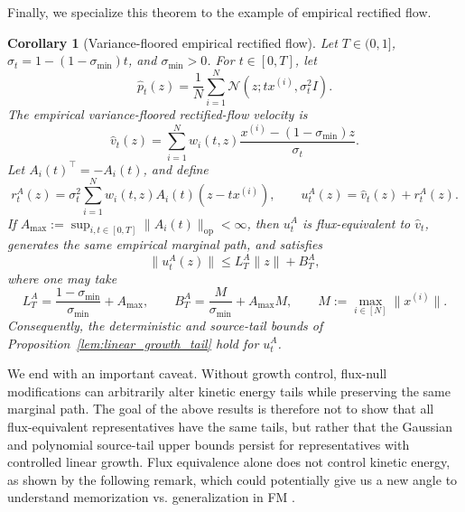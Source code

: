 \documentclass[a4paper,11pt]{article}
\theoremstyle{plain}
\newtheorem{corollaryinner}[theoreminner]{Corollary}
\theoremstyle{definition}
\newenvironment{corollary}[1][]
  {\begin{mdframed}[style=corstyle]\begin{corollaryinner}[#1]}
  {\end{corollaryinner}\end{mdframed}}
\begin{document}
Finally, we specialize this theorem to the example of empirical rectified flow.  
\begin{corollary}[Variance-floored empirical rectified flow]
\label{cor:flux_equiv_vfrf}
Let \(T\in(0,1]\), \(\sigma_t=1-(1-\sigma_{\min})t\), and
\(\sigma_{\min}>0\). For \(t\in[0,T]\), let
\[
    \hat p_t(z)
    =
    \frac1N\sum_{i=1}^N
    \mathcal N(z;tx^{(i)},\sigma_t^2I).
\]
The empirical variance-floored rectified-flow velocity is
\[
    \hat v_t(z)
    =
    \sum_{i=1}^N
    w_i(t,z)
    \frac{x^{(i)}-(1-\sigma_{\min})z}{\sigma_t}.
\]
Let \(A_i(t)^\top=-A_i(t)\), and define
\[
    r_t^A(z)
    =
    \sigma_t^2
    \sum_{i=1}^N
    w_i(t,z)A_i(t)(z-tx^{(i)}),
    \qquad
    u_t^A(z)=\hat v_t(z)+r_t^A(z).
\]
If \(A_{\max}:=\sup_{i,t\in[0,T]}\|A_i(t)\|_{\mathrm{op}}<\infty\), then
\(u_t^A\) is flux-equivalent to \(\hat v_t\), generates the same empirical
marginal path, and satisfies
\[
    \|u_t^A(z)\|
    \le
    L_T^A\|z\|+B_T^A,
\]
where one may take
\[
    L_T^A
    =
    \frac{1-\sigma_{\min}}{\sigma_{\min}}
    +
    A_{\max},
    \qquad
    B_T^A
    =
    \frac{M}{\sigma_{\min}}
    +
    A_{\max}M,
    \qquad
    M:=\max_{i\in[N]}\|x^{(i)}\|.
\]
Consequently, the deterministic and source-tail bounds of
Proposition~\ref{lem:linear_growth_tail} hold for \(u_t^A\).
\end{corollary}

We end with an important caveat. Without growth control, flux-null modifications can arbitrarily alter kinetic
energy tails while preserving the same marginal path. The goal of the above
results is therefore not to show that all flux-equivalent representatives have
the same tails, but rather that the Gaussian and polynomial source-tail upper
bounds persist for representatives with controlled linear growth.  Flux equivalence alone does not control kinetic energy, as shown by the following remark, which could potentially give us a new angle to understand memorization vs. generalization in FM \cite{li2026kinetic}.
\end{document}
